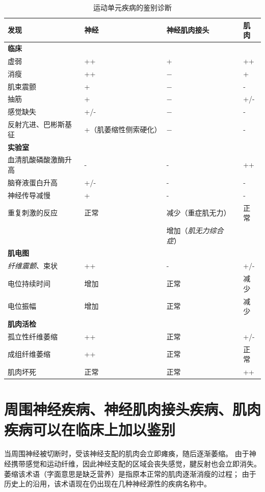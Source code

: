 \begin{table}[htbp]
	\caption{运动单元疾病的鉴别诊断} \label{tab:57_1} \centering
	\begin{tabular}{llll}
		\toprule
		发现 & 神经 & 神经肌肉接头 & 肌肉\\
		\midrule
		\textbf{临床} &  &  &  \\
		虚弱 & ++ & + & ++ \\
		消瘦 & ++ & − & + \\
		肌束震颤 & + & − & - \\
		抽筋 & + & − & +/- \\
		感觉缺失 & +/- & − & - \\
		反射亢进、巴彬斯基征 & +（肌萎缩性侧索硬化） & − & - \\
		\textbf{实验室} &  &  &  \\
		血清肌酸磷酸激酶升高 & - & - & ++ \\
		脑脊液蛋白升高 & +/- & - & - \\
		神经传导减慢 & + & - & - \\
		重复刺激的反应 & 正常 & 减少（重症肌无力） & 正常 \\
		 &  & 增加（\textit{肌无力综合症}） &  \\
		\textbf{肌电图} &  &  &  \\
		\textit{纤维震颤}、束状 & ++ & - & +/- \\
		电位持续时间 & 增加 & 正常 & 减少 \\
		电位振幅 & 增加 & 正常 & 减少 \\
		\textbf{肌肉活检} &  &  &  \\
		孤立性纤维萎缩 & ++ & 正常 & +/- \\
		成组纤维萎缩 & ++ & 正常 & 正常 \\
		肌肉坏死 & 正常 & 正常 & ++ \\
		\bottomrule
	\end{tabular}
\end{table}



\section{周围神经疾病、神经肌肉接头疾病、肌肉疾病可以在临床上加以鉴别}

当周围神经被切断时，受该神经支配的肌肉会立即瘫痪，随后逐渐萎缩。
由于神经携带感觉和运动纤维，因此神经支配的区域会丧失感觉，腱反射也会立即消失。
萎缩该术语（字面意思是缺乏营养）是指原本正常的肌肉逐渐消瘦的过程；
由于历史上的沿用，该术语现在仍出现在几种神经源性的疾病名称中。


